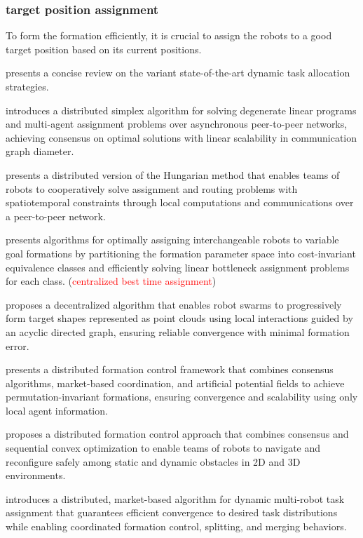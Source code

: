 \subsubsection{target position assignment}

To form the formation efficiently, it is crucial to assign the robots to a good target position based on its current positions.

\cite{rm2020review} presents a concise review on the variant state-of-the-art dynamic task allocation strategies.

\cite{burger2012distributed} introduces a distributed simplex algorithm for solving degenerate linear programs and multi-agent assignment problems over asynchronous peer-to-peer networks, achieving consensus on optimal solutions with linear scalability in communication graph diameter.

\cite{chopra2017distributed} presents a distributed version of the Hungarian method that enables teams of robots to cooperatively solve assignment and routing problems with spatiotemporal constraints through local computations and communications over a peer-to-peer network.

\cite{akella2020assignment} presents algorithms for optimally assigning interchangeable robots to variable goal formations by partitioning the formation parameter space into cost-invariant equivalence classes and efficiently solving linear bottleneck assignment problems for each class. (\textcolor{red}{centralized best time assignment})

\cite{li2019decentralized} proposes a decentralized algorithm that enables robot swarms to progressively form target shapes represented as point clouds using local interactions guided by an acyclic directed graph, ensuring reliable convergence with minimal formation error.

\cite{zavlanos2007distributed} presents a distributed formation control framework that combines consensus algorithms, market-based coordination, and artificial potential fields to achieve permutation-invariant formations, ensuring convergence and scalability using only local agent information.

\cite{alonso2016distributed} proposes a distributed formation control approach that combines consensus and sequential convex optimization to enable teams of robots to navigate and reconfigure safely among static and dynamic obstacles in 2D and 3D environments.

\cite{michael2008distributed} introduces a distributed, market-based algorithm for dynamic multi-robot task assignment that guarantees efficient convergence to desired task distributions while enabling coordinated formation control, splitting, and merging behaviors.

